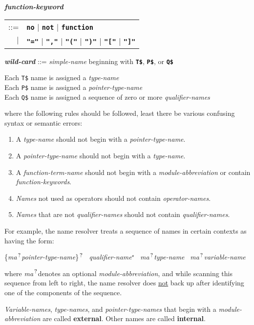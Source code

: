 \documentclass[12pt]{article}
\newcommand{\TT}[1]{{\tt \bfseries #1}}
\newcommand{\STAR}{{\Large $^\star$}}
\newcommand{\QMARK}{{$^{\,\mbox{\footnotesize ?}}$}}
\newcommand{\MA}{{\em ma}\QMARK}
\newcommand{\key}[1]{{\rm \bfseries #1}}
\newcommand{\emkey}[1]{{\em \bfseries #1}}
\newenvironment{indpar}[1][0.3in]%
	{\begin{list}{}%
		     {\setlength{\itemsep}{0in}%
		      \setlength{\topsep}{0in}%
		      \setlength{\parsep}{1ex}%
		      \setlength{\labelwidth}{#1}%
		      \setlength{\leftmargin}{#1}%
		      \addtolength{\leftmargin}{\labelsep}}%
	 \item}%
	{\end{list}}
\begin{document}
\begin{indpar}
\emkey{function-keyword}
    \begin{tabular}[t]{rl}
    ::= & \TT{no} $|$ \TT{not} $|$ \TT{function} \\
    $|$ & \TT{"="} $|$ \TT{","} $|$ \TT{"("} $|$ \TT{")"} $|$
          \TT{"["} $|$ \TT{"]"}
    \end{tabular}

\emkey{wild-card}\label{WILD-CARD}
    ::= {\em simple-name} beginning with \TT{T\$}, \TT{P\$}, or \TT{Q\$}
\begin{indpar}
Each {\tt T\$} name is assigned a {\em type-name} \\
Each {\tt P\$} name is assigned a {\em pointer-type-name} \\
Each {\tt Q\$} name is assigned a sequence of zero or more
               {\em qualifier-names}
\end{indpar}

where the following rules should be followed, least there be
various confusing syntax or semantic errors:
\begin{enumerate}
\item
A {\em type-name} should not begin with a {\em pointer-type-name}.
\item
A {\em pointer-type-name} should not begin with a {\em type-name}.
\item
A {\em function-term-name} should not begin with a {\em module-abbreviation}
or contain {\em function-keywords}.
\item
{\em Names} not used as operators should not contain {\em operator-names}.
\item
{\em Names} that are not {\em qualifier-names}
should not contain {\em qualifier-names}.
\end{enumerate}
\end{indpar}

For example,
the name resolver treats a sequence of
names in certain contexts as having the form:
\begin{center}
\{\MA {\em pointer-type-name}\}\QMARK{}~
{\em qualifier-name}\STAR{}~
\MA {\em type-name}~
\MA {\em variable-name}
\end{center}
where \MA denotes an optional {\em module-abbreviation},
and while scanning this sequence from left to right,
the name resolver does \underline{not} back up after identifying
one of the components of the sequence.

{\em Variable-names}, {\em type-names}, and {\em pointer-type-names}
that begin with a {\em module-abbreviation} are called
\key{external}\label{EXTERNAL-NAME}.
Other names are called \key{internal}\label{INTERNAL-NAME}.
\end{document}
